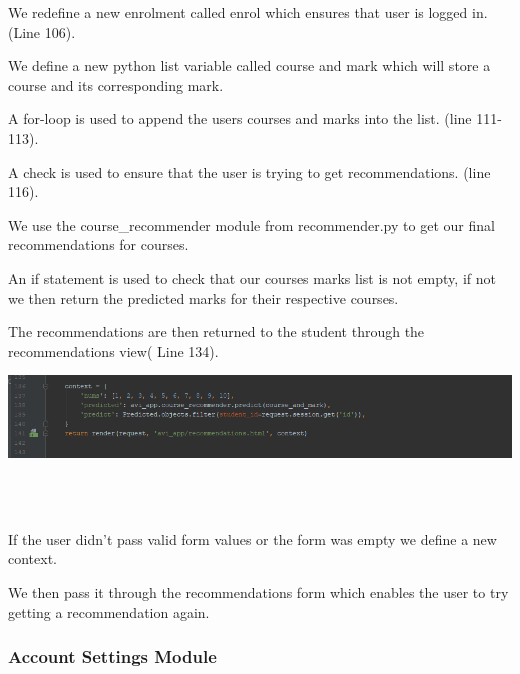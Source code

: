\documentclass[10pt]{article}
\begin{document}
\begin{description}[font=$\bullet$~\normalfont\scshape\color{red!50!black}]
\item [] We redefine a new enrolment called enrol which ensures that user is logged in.(Line 106). 
\item [] We define a new python list variable called course and mark which will store a course and its corresponding mark.
\item [] A for-loop is used to append the users courses and marks into the list. (line 111-113).
\item [] A check is used to ensure that the user is trying to get recommendations. (line 116).
\item [] We use the course\_recommender module from recommender.py to get our final recommendations for courses.
\item [] An if statement is used to check that our courses marks list is not empty, if not we then return the predicted marks for their respective courses.
\item [] The recommendations are then returned to the student through the recommendations view( Line 134).

\begin{center}
\includegraphics[width=1.1\textwidth]{p13.png}
\end{center} \\ \\

\item [] If the user didn’t pass valid form values or the form was empty we define a new context.

\item [] We then pass it through the recommendations form which enables the user to try getting  a recommendation again.

\end{description}

\subsubsection{Account Settings Module}
\end{document}
